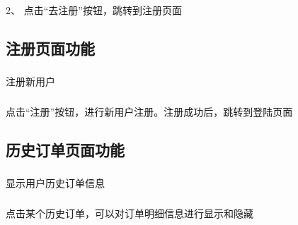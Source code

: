 2、 点击“去注册”按钮，跳转到注册页面

\subsection{注册页面功能}
\subsubsection*{}
注册新用户
\subsubsection*{}
点击“注册”按钮，进行新用户注册。注册成功后，跳转到登陆页面

\subsection{历史订单页面功能}
\subsubsection*{}
显示用户历史订单信息
\subsubsection*{}
点击某个历史订单，可以对订单明细信息进行显示和隐藏

